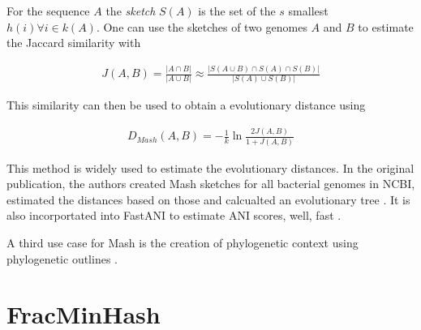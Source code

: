 For the sequence $A$ the \textit{sketch} $S(A)$ is the set of the $s$
smallest $h(i) \forall i \in k(A)$. One can use the sketches of two genomes
$A$ and $B$ to estimate the Jaccard similarity with 

\begin{align}
  J(A, B) = \frac{|A \cap B|}{|A \cup B|} \approx \frac{|S(A \cup B) \cap S(A) \cap S(B)|}{|S(A) \cup S(B)|}
\end{align}

This similarity can then be used to obtain a evolutionary distance using

\begin{align}
  D_{Mash}(A,B) = -\frac{1}{k}\ln{\frac{2J(A,B)}{1+J(A,B)}}
\end{align}

This method is widely used to estimate the evolutionary distances. In the
original publication, the authors created Mash sketches for all bacterial
 genomes in NCBI, estimated the
distances based on those and calcualted an evolutionary tree
\cite{ondovMashFastGenome2016}. It is also incorportated into FastANI to
estimate ANI scores, well, fast \cite{jainHighThroughputANI2018}.

A third use case for Mash is the creation of phylogenetic context using
phylogenetic outlines \cite{bagciMicrobialPhylogeneticContext2021}.

\section{FracMinHash}